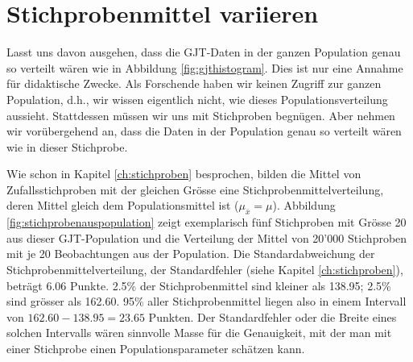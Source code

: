 \documentclass[oneside, 10pt]{book}\usepackage[]{graphicx}\usepackage[]{xcolor}
\begin{document}
\section{Stichprobenmittel variieren}
Lasst uns davon ausgehen,
dass die GJT-Daten in der ganzen
Population genau so verteilt wären wie in
Abbildung \ref{fig:gjthistogram}.
Dies ist nur eine Annahme für didaktische Zwecke.
Als Forschende haben wir keinen Zugriff zur ganzen Population,
d.h., wir wissen eigentlich nicht,
wie dieses Populationsverteilung aussieht.
Stattdessen müssen wir uns mit Stichproben begnügen.
Aber nehmen wir vorübergehend an, dass die Daten in der Population
genau so verteilt wären wie in dieser Stichprobe.

Wie schon in Kapitel \ref{ch:stichproben} besprochen,
bilden die Mittel von Zufallsstichproben mit der gleichen Grösse
eine Stichprobenmittelverteilung, deren Mittel gleich dem
Populationsmittel ist ($\mu_{\bar{x}} = \mu$).
Abbildung \ref{fig:stichprobenauspopulation} zeigt exemplarisch fünf
Stichproben mit Grösse 20 aus dieser GJT-Population und die
Verteilung der Mittel von 20'000 Stichproben mit je 20 Beobachtungen aus
der Population.
Die Standardabweichung der Stichprobenmittelverteilung,
der Standardfehler (siehe Kapitel \ref{ch:stichproben}),
beträgt 6.06 Punkte.
2.5\% der Stichprobenmittel sind kleiner als 138.95;
2.5\% sind grösser als 162.60.
95\% aller Stichprobenmittel liegen also in einem Intervall
von $162.60-138.95 = 23.65$ Punkten.
Der Standardfehler oder die Breite eines solchen Intervalls
wären sinnvolle Masse für die Genauigkeit, mit der man mit einer
Stichprobe einen Populationsparameter schätzen kann.
\end{document}
